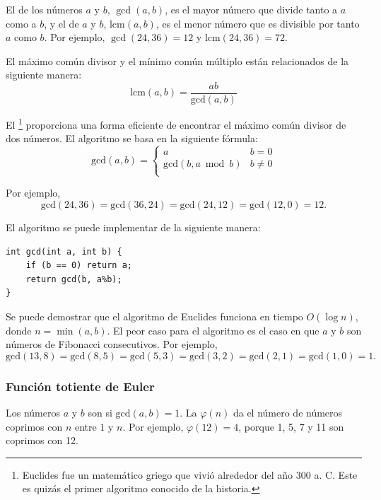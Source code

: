 
El  de
los números $a$ y $b$, $\gcd(a,b)$,
es el mayor número que divide tanto a $a$ como a $b$,
y el  de
$a$ y $b$, $\textrm{lcm}(a,b)$,
es el menor número que es divisible por
tanto $a$ como $b$.
Por ejemplo,
$\gcd(24,36)=12$ y
$\textrm{lcm}(24,36)=72$.

El máximo común divisor y el mínimo común múltiplo
están relacionados de la siguiente manera:
\[\textrm{lcm}(a,b)=\frac{ab}{\textrm{gcd}(a,b)}\]

El \footnote{Euclides fue un matemático griego que
vivió alrededor del año 300 a. C. Este es quizás el primer algoritmo conocido de la historia.} proporciona una forma eficiente
de encontrar el máximo común divisor de dos números.
El algoritmo se basa en la siguiente fórmula:
\begin{equation*}
    \textrm{gcd}(a,b) = \begin{cases}
               a        & b = 0\\
               \textrm{gcd}(b,a \bmod b) & b \neq 0\\
           \end{cases}
\end{equation*}

Por ejemplo,
\[\textrm{gcd}(24,36) = \textrm{gcd}(36,24)
= \textrm{gcd}(24,12) = \textrm{gcd}(12,0)=12.\]

El algoritmo se puede implementar de la siguiente manera:
\begin{lstlisting}
int gcd(int a, int b) {
    if (b == 0) return a;
    return gcd(b, a%b);
}
\end{lstlisting}

Se puede demostrar que el algoritmo de Euclides funciona
en tiempo $O(\log n)$, donde $n=\min(a,b)$.
El peor caso para el algoritmo es
el caso en que $a$ y $b$ son números de Fibonacci consecutivos.
Por ejemplo,
\[\textrm{gcd}(13,8)=\textrm{gcd}(8,5)
=\textrm{gcd}(5,3)=\textrm{gcd}(3,2)=\textrm{gcd}(2,1)=\textrm{gcd}(1,0)=1.\]

\subsubsection{Función totiente de Euler}


Los números $a$ y $b$ son 
si $\textrm{gcd}(a,b)=1$.
La  $\varphi(n)$
da el número de números coprimos con $n$
entre $1$ y $n$.
Por ejemplo, $\varphi(12)=4$,
porque 1, 5, 7 y 11
son coprimos con 12.

